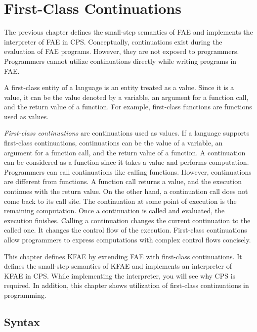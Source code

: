 \setchapterpreamble[u]{\margintoc}
\chapter{First-Class Continuations}

\renewcommand{\plang}{\textsf{FAE}\xspace}
\renewcommand{\lang}{\textsf{KFAE}\xspace}

The previous chapter defines the small-step semantics of \plang and implements
the interpreter of \plang in CPS. Conceptually,
continuations exist during the evaluation of \plang programs. However, they are
not exposed to programmers. Programmers cannot utilize continuations directly while
writing programs in \plang.

A first-class entity of a language is an entity treated as a
value. Since it is a value, it can be the value denoted by a variable, an argument for a
function call, and the return value of a function. For example, first-class
functions are functions used as values.

\textit{First-class continuations}
are continuations used as values. If a language
supports first-class continuations, continuations can be the value of a variable,
an argument for a function call, and the return value of a function. A
continuation can be considered as a function since it takes a value and performs
computation. Programmers can call continuations like calling functions. However,
continuations are different from functions. A function call returns a value, and
the execution continues with the return value. On the other hand, a continuation
call does not come back to its call site. The continuation at some point of execution
is the remaining computation. Once a continuation is called and evaluated,
the execution finishes. Calling a continuation changes the
current continuation to the called one. It changes the control flow of the
execution. First-class continuations allow programmers to express
computations with complex control flows concisely.

This chapter defines \lang by extending \plang with first-class continuations.
It defines the small-step semantics of \lang and implements an interpreter of
\lang in CPS. While implementing the interpreter, you will see why CPS is required.
In addition, this chapter shows utilization of first-class continuations in
programming.

\section{Syntax}

